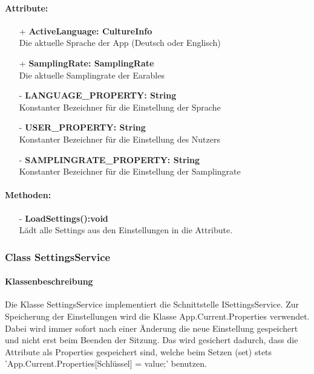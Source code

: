 \documentclass[a4paper,12pt]{article}
\begin{document}
	\paragraph{Attribute:}
	\begin{itemize}
		\item[+] \textbf{ActiveLanguage: CultureInfo}\\Die aktuelle Sprache der App (Deutsch oder Englisch)\\
		\item[+] \textbf{SamplingRate: SamplingRate}\\Die aktuelle Samplingrate der \Gls{Earables} \\ 
		\item[-] \textbf{LANGUAGE\_PROPERTY: String}\\Konstanter Bezeichner für die Einstellung der Sprache \\
		\item[-] \textbf{USER\_PROPERTY: String}\\Konstanter Bezeichner für die Einstellung des Nutzers \\
		\item[-] \textbf{SAMPLINGRATE\_PROPERTY: String}\\Konstanter Bezeichner für die Einstellung der Samplingrate \\
	\end{itemize}
	\paragraph{Methoden:}
	\begin{itemize}
		\item[-] \textbf{LoadSettings():void}\\Lädt alle Settings aus den Einstellungen in die Attribute.	
	\end{itemize}
\subsubsection{Class SettingsService}
	\paragraph{Klassenbeschreibung}
	Die Klasse SettingsService implementiert die Schnittstelle ISettingsService. Zur Speicherung der Einstellungen wird die Klasse App.Current.Properties verwendet.
	Dabei wird immer sofort nach einer Änderung die neue Einstellung gespeichert und nicht erst beim Beenden der Sitzung.
	Das wird gesichert dadurch, dass die Attribute als Properties gespeichert sind, welche beim Setzen (set) stets 'App.Current.Properties[Schlüssel] = value;' benutzen.
\end{document}
